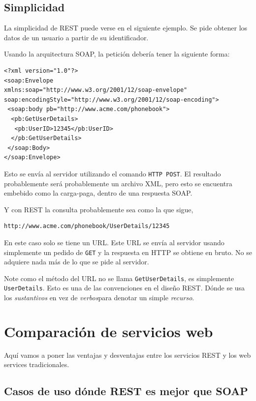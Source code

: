 \documentclass[conference]{IEEEtran}
\begin{document}
\subsection{Simplicidad}
\label{sec:rest-simp}

La simplicidad de REST puede verse en el siguiente ejemplo. Se pide
obtener los datos de un usuario a partir de su identificador. 

Usando la arquitectura SOAP, la petición debería tener la siguiente
forma:

{\footnotesize 
\begin{verbatim}
<?xml version="1.0"?>
<soap:Envelope
xmlns:soap="http://www.w3.org/2001/12/soap-envelope"
soap:encodingStyle="http://www.w3.org/2001/12/soap-encoding">
 <soap:body pb="http://www.acme.com/phonebook">
  <pb:GetUserDetails>
   <pb:UserID>12345</pb:UserID>
  </pb:GetUserDetails>
 </soap:Body>
</soap:Envelope>
\end{verbatim}
}

Esto se envía al servidor utilizando el comando \texttt{HTTP POST}. El
resultado probablemente será probablemente un archivo XML, pero esto
se encuentra embebido como la carga-paga, dentro de una respuesta
SOAP.

Y con REST la consulta probablemente sea como la que sigue,

{\footnotesize 
\begin{verbatim}
http://www.acme.com/phonebook/UserDetails/12345
\end{verbatim}
}

En este caso solo se tiene un URL. Este URL se envía al servidor
usando simplemente un pedido de \texttt{GET} y la respuesta en HTTP se
obtiene en bruto. No se adquiere nada más de lo que se pide al
servidor. 

Note como el método del URL no se llama \texttt{GetUserDetails}, es
simplemente \texttt{UserDetails}. Esto es una de las convenciones en
el diseño REST. Dónde se usa los \emph{sustantivos} en vez de
\emph{verbos}para denotar un simple \emph{recurso}.

\section{Comparación de servicios web}
\label{sec:comparacion}

Aquí vamos a poner las ventajas y desventajas entre los servicios REST
y los web services tradicionales.

\subsection{Casos de uso dónde REST es mejor que SOAP}
\label{sec:cu-rest-better-soap}
\end{document}
